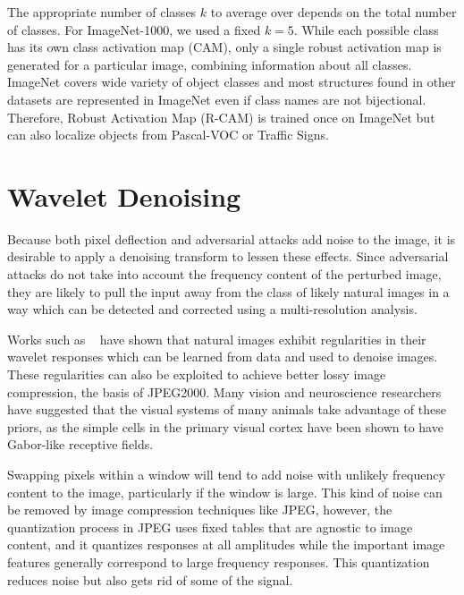 The appropriate number of classes $k$ to average over depends on the total number of classes.
For ImageNet-1000, we used a fixed $k=5$.
While each possible class has its own class activation map (CAM), only a single robust activation map is generated for a particular image, combining information about all classes.
ImageNet covers wide variety of object classes and most structures found in other datasets are represented in ImageNet even if class names are not bijectional.
Therefore, Robust Activation Map (R-CAM) is trained once on ImageNet but can also localize objects from Pascal-VOC or Traffic Signs. 


\section{Wavelet Denoising\label{sec:wavelet}}
Because both pixel deflection and adversarial attacks add noise to the image, it is desirable to apply a denoising transform to lessen these effects.
Since adversarial attacks do not take into account the frequency content of the perturbed image, they are likely to pull the input away from the class of likely natural images in a way which can be detected and corrected using a multi-resolution analysis. 

Works such as  ~\cite{BayesShrinkChang2000,Simoncelli1999BayesianDO,field1987relations} have shown that natural images exhibit regularities in their wavelet responses which can be learned from data and used to denoise images.
These regularities can also be exploited to achieve better lossy image compression, the basis of JPEG2000.
Many vision and neuroscience researchers  ~\cite{Marcelja1980MathematicalDO,Rust2005SpatiotemporalEO,Hubel1959ReceptiveFO} have suggested that the visual systems of many animals take advantage of these priors, as the simple cells in the primary visual cortex have been shown to have Gabor-like receptive fields.

Swapping pixels within a window will tend to add noise with unlikely frequency content to the image, particularly if the window is large.
This kind of noise can be removed by image compression techniques like JPEG, however, the quantization process in JPEG uses fixed tables that are agnostic to image content, and it quantizes responses at all amplitudes while the important image features generally correspond to large frequency responses.
This quantization reduces noise but also gets rid of some of the signal. %

